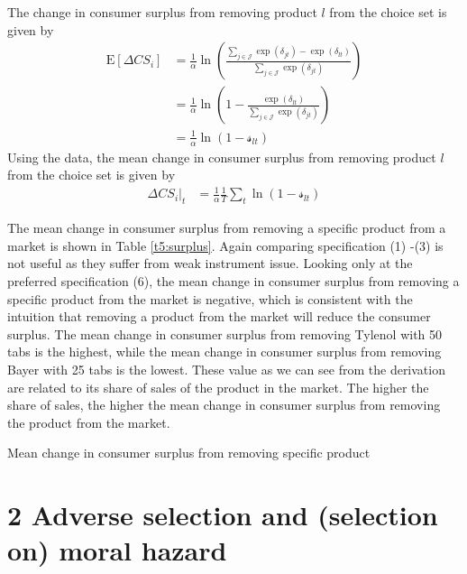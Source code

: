 \documentclass{article}
\newcommand{\E}{\text{E}}
\begin{document}
\begin{enumerate}
The change in consumer surplus from removing product $l$ from the choice set is given by
\begin{align*}
    \E[\Delta CS_i]&=\frac{1}{\alpha} \ln\left(\frac{\sum_{j\in \mathcal{J}}\exp(\delta_{jt})-\exp{(\delta_{lt})}}{\sum_{j\in \mathcal{J}}\exp{(\delta_{jt})}}\right)\\
    &=\frac{1}{\alpha}\ln\left(1-\frac{\exp{(\delta_{lt})}}{\sum_{j\in \mathcal{J}}\exp{(\delta_{jt})}}\right)\\
    &=\frac{1}{\alpha}\ln\left(1-\mathcal{s}_{lt}\right)
\end{align*}
Using the data, the mean change in consumer surplus from removing product $l$ from the choice set is given by
\begin{align*}
    \Delta CS_i\vert_t&=\frac{1}{\alpha} \frac{1}{T}\sum_{t}\ln\left(1-\mathcal{s}_{lt}\right)
\end{align*}

The mean change in consumer surplus from removing a specific product from a market is shown in Table \ref{t5:surplus}. Again comparing specification (1) -(3) is not useful as they suffer from weak instrument issue. Looking only at the preferred specification (6), the mean change in consumer surplus from removing a specific product from the market is negative, which is consistent with the intuition that removing a product from the market will reduce the consumer surplus. The mean change in consumer surplus from removing Tylenol with 50 tabs is the highest, while the mean change in consumer surplus from removing Bayer with 25 tabs is the lowest. These value as we can see from the derivation are related to its share of sales of the product in the market. The higher the share of sales, the higher the mean change in consumer surplus from removing the product from the market.

\begin{table}[H]
\centering
\caption{Mean change in consumer surplus from removing specific product}\label{t5:surplus}
\begin{threeparttable}

\end{threeparttable}
\end{table}

\end{enumerate}

\section*{2 Adverse selection and (selection on) moral hazard}
\end{document}
